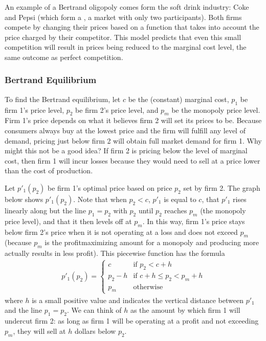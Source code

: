 \documentclass[letterpaper,10pt,english]{jupyterBook}
\begin{document}
\sphinxAtStartPar
An example of a Bertrand oligopoly comes form the soft drink industry: Coke and Pepsi (which form a , a market with only two participants). Both firms compete by changing their prices based on a function that takes into account the price charged by their competitor. This model predicts that even this small competition will result in prices being reduced to the marginal cost level, the same outcome as perfect competition.


\subsubsection{Bertrand Equilibrium}
\label{\detokenize{content/07-game-theory/bertrand:bertrand-equilibrium}}
\sphinxAtStartPar
To find the Bertrand equilibrium, let \(c\) be the (constant) marginal cost, \(p_1\) be firm 1’s price level, \(p_2\) be firm 2’s price level, and \(p_m\) be the monopoly price level. Firm 1’s price depends on what it believes firm 2 will set its prices to be. Because consumers always buy at the lowest price and the firm will fulfill any level of demand, pricing just below firm 2 will obtain full market demand for firm 1. Why might this not be a good idea? If firm 2 is pricing below the level of marginal cost, then firm 1 will incur losses because they would need to sell at a price lower than the cost of production.

\sphinxAtStartPar
Let \(p'_1(p_2)\) be firm 1’s optimal price based on price \(p_2\) set by firm 2. The graph below shows \(p'_1(p_2)\). Note that when \(p_2 < c\), \(p'_1\) is equal to \(c\), that \(p'_1\) rises linearly along but  the line \(p_1 = p_2\) with \(p_2\) until \(p_2\) reaches \(p_m\) (the monopoly price level), and that it then levels off at \(p_m\). In this way, firm 1’s price stays below firm 2’s price when it is not operating at a loss and does not exceed \(p_m\) (because \(p_m\) is the profit\sphinxhyphen{}maximizing amount for a monopoly and producing more actually results in less profit). This piecewise function has the formula
\begin{equation*}
\begin{split}
p'_1(p_2) = \begin{cases}
c & \text{if } p_2 < c + h \\
p_2 - h & \text{if } c + h \le p_2 < p_m + h \\
p_m & \text{otherwise}
\end{cases}
\end{split}
\end{equation*}
\sphinxAtStartPar
where \(h\) is a small positive value and indicates the vertical distance between \(p'_1\) and the line \(p_1 = p_2\). We can think of \(h\) as the amount by which firm 1 will undercut firm 2: as long as firm 1 will be operating at a profit and not exceeding \(p_m\), they will sell at \(h\) dollars below \(p_2\).
\end{document}
